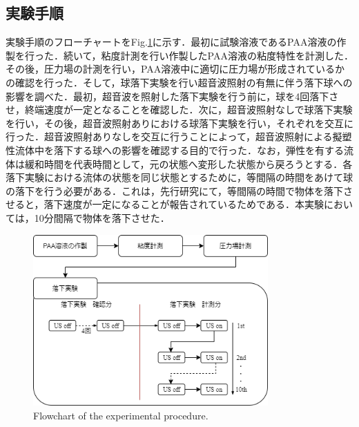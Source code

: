 \newpage

\subsection{実験手順}

実験手順のフローチャートをFig.\ref{fig:exp-methods}に示す．最初に試験溶液であるPAA溶液の作製を行った．続いて，粘度計測を行い作製したPAA溶液の粘度特性を計測した．その後，圧力場の計測を行い，PAA溶液中に適切に圧力場が形成されているかの確認を行った．そして，球落下実験を行い超音波照射の有無に伴う落下球への影響を調べた．最初，超音波を照射した落下実験を行う前に，球を4回落下させ，終端速度が一定となることを確認した．次に，超音波照射なしで球落下実験を行い，その後，超音波照射ありにおける球落下実験を行い，それぞれを交互に行った．超音波照射ありなしを交互に行うことによって，超音波照射による擬塑性流体中を落下する球への影響を確認する目的で行った．なお，弾性を有する流体は緩和時間を代表時間として，元の状態へ変形した状態から戻ろうとする．各落下実験における流体の状態を同じ状態とするために，等間隔の時間をあけて球の落下を行う必要がある．これは，先行研究\cite{ref:8-5}にて，等間隔の時間で物体を落下させると，落下速度が一定になることが報告されているためである．本実験においては，10分間隔で物体を落下させた．

\begin{figure}[ht]
    \centering
    \includegraphics[clip,width=9.0cm]{2-Methods/exp-methods.png}
    \caption{Flowchart of the experimental procedure.}
    \label{fig:exp-methods}
\end{figure}
